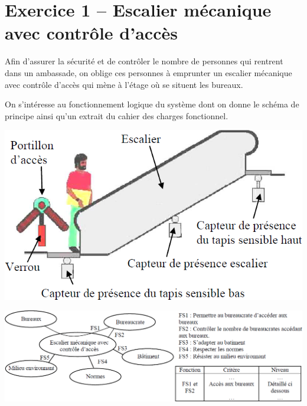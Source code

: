 \documentclass[11pt,oneside]{article}
\begin{document}
\section*{Exercice 1 -- Escalier mécanique avec contrôle d'accès}

\begin{minipage}[c]{.45\linewidth}
Afin d'assurer la sécurité et de contrôler le nombre de personnes qui rentrent dans un ambassade, on oblige ces personnes à emprunter un escalier mécanique avec contrôle d'accès qui mène à l'étage où se situent les bureaux.

On s'intéresse au fonctionnement logique du système dont on donne le schéma de principe ainsi qu'un extrait du cahier des charges fonctionnel.


\end{minipage}
\hfill
\begin{minipage}[c]{.45\linewidth}
\begin{center}
\includegraphics[width=.9\textwidth]{png/fig1}
\end{center}
\end{minipage}

\begin{center}
\includegraphics[width=.9\textwidth]{png/fig2}
\end{center}
\end{document}
